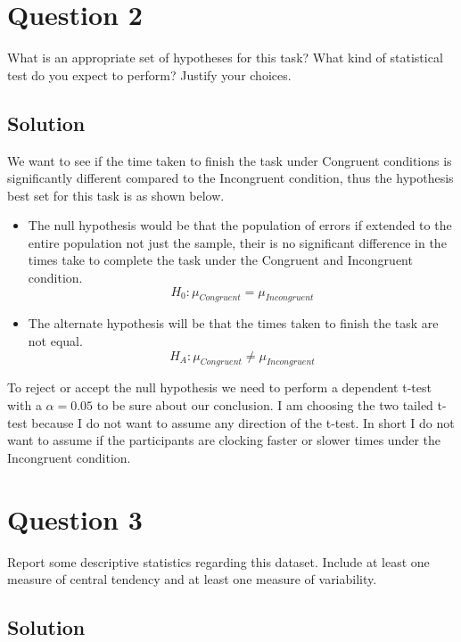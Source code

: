 \documentclass[12pt]{article}%
\begin{document}
\section*{Question 2}

What is an appropriate set of hypotheses for this task? What kind of statistical test do you expect to perform? Justify your choices.

\subsection*{Solution}

We want to see if the time taken to finish the task under Congruent conditions is significantly different compared to the Incongruent condition, thus the hypothesis best set for this task is as shown below.
\begin{itemize}
  \item The null hypothesis would be that the population of errors if extended to the entire population not just the sample, their is no significant difference in the times take to complete the task under the Congruent and Incongruent condition.
  \begin{equation}
  H_{0}:  \mu_{Congruent} = \mu_{Incongruent}
  \end{equation}

  \item  The alternate hypothesis will be that the times taken to finish the task are not equal.
  \begin{equation}
  H_{A}:  \mu_{Congruent} \neq \mu_{Incongruent}
  \end{equation}
\end{itemize}

To reject or accept the null hypothesis we need to perform a dependent t-test with a $\alpha=0.05$ to be sure about our conclusion. I am choosing the two tailed t-test because I do not want to assume any direction of the t-test. In short I do not want to assume if the participants are clocking faster or slower times under the Incongruent condition. 


\section*{Question 3}

Report some descriptive statistics regarding this dataset. Include at least one measure of central tendency and at least one measure of variability.

\subsection*{Solution}
\end{document}
